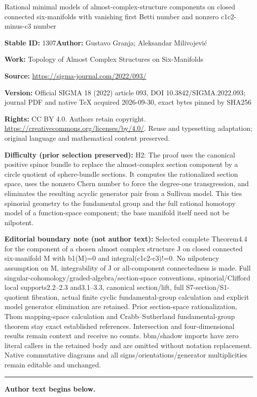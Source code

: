 \documentclass[11pt]{article}
\numberwithin{equation}{section}
\numberwithin{equation}{section}
\begin{document}
\begin{center}\Large Rational minimal models of almost-complex-structure components on closed connected six-manifolds with vanishing first Betti number and nonzero c1c2-minus-c3 number\end{center}
\noindent\textbf{Stable ID:} 1307\quad\textbf{Author:} Gustavo Granja; Aleksandar Milivojević\par
\noindent\textbf{Work:} Topology of Almost Complex Structures on Six-Manifolds\par
\noindent\textbf{Source:} \url{https://sigma-journal.com/2022/093/}\par
\noindent\textbf{Version:} Official SIGMA 18 (2022) article 093, DOI 10.3842/SIGMA.2022.093; journal PDF and native TeX acquired 2026-09-30, exact bytes pinned by SHA256\par
\noindent\textbf{Rights:} CC BY 4.0. Authors retain copyright. \url{https://creativecommons.org/licenses/by/4.0/}. Reuse and typesetting adaptation; original language and mathematical content preserved.\par
\noindent\textbf{Difficulty (prior selection preserved):} {\CJKfont H2: The proof uses the canonical positive spinor bundle to replace the almost-complex section component by a circle quotient of sphere-bundle sections. It computes the rationalized section space, uses the nonzero Chern number to force the degree-one transgression, and eliminates the resulting acyclic generator pair from a Sullivan model. This ties spinorial geometry to the fundamental group and the full rational homotopy model of a function-space component; the base manifold itself need not be nilpotent.}\par
\medskip\noindent\textbf{Editorial boundary note (not author text):} Selected complete Theorem4.4 for the component of a chosen almost complex structure J on closed connected six-manifold M with b1(M)=0 and integral(c1c2-c3)!=0. No nilpotency assumption on M, integrability of J or all-component connectedness is made. Full singular-cohomology/graded-algebra/section-space conventions, spinorial/Clifford local supports2.2–2.3 and3.1–3.3, canonical section/lift, full S7-section/S1-quotient fibration, actual finite cyclic fundamental-group calculation and explicit model generator elimination are retained. Prior section-space rationalization, Thom mapping-space calculation and Crabb–Sutherland fundamental-group theorem stay exact established references. Intersection and four-dimensional results remain context and receive no counts. bbm/shadow imports have zero literal callers in the retained body and are omitted without notation replacement. Native commutative diagrams and all signs/orientations/generator multiplicities remain editable and unchanged.\par
\medskip\hrule\medskip\noindent\textbf{Author text begins below.}\par
\end{document}
